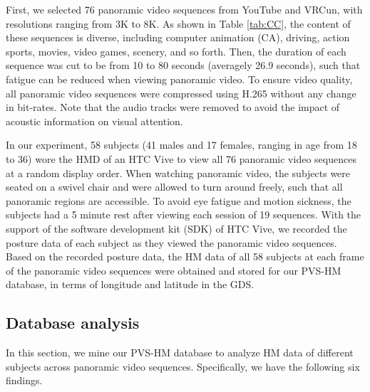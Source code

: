 \documentclass[10pt,journal,compsoc]{IEEEtran}
\begin{document}
First, we selected 76 panoramic video sequences from YouTube and VRCun, with resolutions ranging from 3K to 8K.
As shown in Table \ref{tab:CC}, the content of these sequences is diverse, including computer animation (CA), driving, action sports, movies, video games, scenery, and so forth.
Then, the duration of each sequence was cut to be from 10 to 80 seconds (averagely 26.9 seconds), such that fatigue can be reduced when viewing panoramic video.
To ensure video quality, all panoramic video sequences were compressed using H.265 \cite{Sullivan2013Overview} without any change in bit-rates.
Note that the audio tracks were removed to avoid the impact of acoustic information on visual attention.

In our experiment, 58 subjects (41 males and 17 females, ranging in age from 18 to 36) wore the HMD of an HTC Vive to view all 76 panoramic video sequences at a random display order.
When watching panoramic video, the subjects were seated on a swivel chair and were allowed to turn around freely, such that all panoramic regions are accessible.
To avoid eye fatigue and motion sickness, the subjects had a 5 minute rest after viewing each session of 19 sequences.
With the support of the software development kit (SDK) of HTC Vive, we recorded the posture data of each subject as they viewed the panoramic video sequences.
Based on the recorded posture data, the HM data of all 58 subjects at each frame of the panoramic video sequences were obtained and stored for our PVS-HM database, in terms of longitude and latitude in the GDS.


\subsection{Database analysis}
\label{Database_analysis}

In this section, we mine our PVS-HM database to analyze HM data of different subjects across panoramic video sequences.
Specifically, we have the following six findings.
\end{document}

